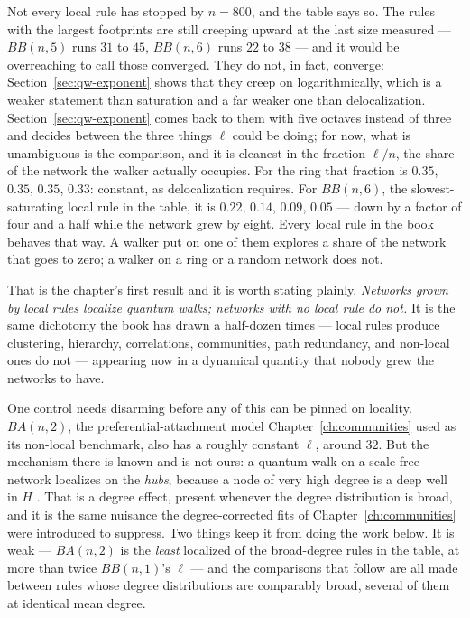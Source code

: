 Not every local rule has stopped by $n=800$, and the table says so. The rules with
the largest footprints are still creeping upward at the last size measured ---
$BB(n,5)$ runs $31$ to $45$, $BB(n,6)$ runs $22$ to $38$ --- and it would be
overreaching to call those converged. They do not, in fact, converge:
Section~\ref{sec:qw-exponent} shows that they creep on logarithmically, which is a
weaker statement than saturation and a far weaker one than delocalization. Section~\ref{sec:qw-exponent} comes back to
them with five octaves instead of three and decides between the three things $\ell$
could be doing; for now, what is unambiguous is the comparison, and it is cleanest in
the fraction $\ell/n$, the share of the network the walker actually occupies. For the ring that fraction is $0.35$, $0.35$, $0.35$, $0.33$: constant, as
delocalization requires. For $BB(n,6)$, the slowest-saturating local rule in the
table, it is $0.22$, $0.14$, $0.09$, $0.05$ --- down by a factor of four and a half
while the network grew by eight. Every local rule in the book behaves that way. A
walker put on one of them explores a share of the network that goes to zero; a
walker on a ring or a random network does not.

That is the chapter's first result and it is worth stating plainly. \emph{Networks
grown by local rules localize quantum walks; networks with no local rule do not.}
It is the same dichotomy the book has drawn a half-dozen times --- local rules
produce clustering, hierarchy, correlations, communities, path redundancy, and
non-local ones do not --- appearing now in a dynamical quantity that nobody grew the
networks to have.

One control needs disarming before any of this can be pinned on locality.
$BA(n,2)$, the preferential-attachment model Chapter~\ref{ch:communities} used as its
non-local benchmark, also has a roughly constant $\ell$, around $32$. But the
mechanism there is known and is not ours: a quantum walk on a scale-free network
localizes on the \emph{hubs}, because a node of very high degree is a deep well in
$H$ \citep{faccin2013}. That is a degree effect, present whenever the degree
distribution is broad, and it is the same nuisance the degree-corrected fits of
Chapter~\ref{ch:communities} were introduced to suppress. Two things keep it from
doing the work below. It is weak --- $BA(n,2)$ is the \emph{least} localized of the
broad-degree rules in the table, at more than twice $BB(n,1)$'s $\ell$ --- and the
comparisons that follow are all made between rules whose degree distributions are
comparably broad, several of them at identical mean degree.

